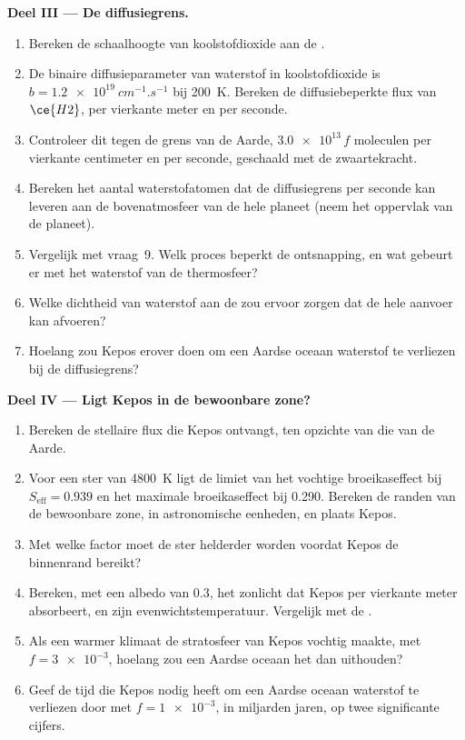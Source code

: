 \begin{problem}
\medskip\noindent\textbf{Deel III --- De diffusiegrens.}
\begin{enumerate}[resume]
\item Bereken de schaalhoogte van koolstofdioxide aan de .
\item De binaire diffusieparameter van waterstof in koolstofdioxide is
  $b = \qty{1.2e19}{cm^{-1}.s^{-1}}$ bij \qty{200}{K}. Bereken de
  diffusiebeperkte flux van $\ce{H2}$, per vierkante meter en per seconde.
\item Controleer dit tegen de grens van de Aarde, $\num{3.0e13}\,f$ moleculen per
  vierkante centimeter en per seconde, geschaald met de zwaartekracht.
\item Bereken het aantal waterstofatomen dat de diffusiegrens per seconde kan
  leveren aan de bovenatmosfeer van de hele planeet (neem het
  oppervlak van de planeet).
\item Vergelijk met vraag~9. Welk proces beperkt de ontsnapping, en wat
  gebeurt er met het waterstof van de thermosfeer?
\item Welke dichtheid van waterstof aan de  zou ervoor zorgen dat
   de hele aanvoer kan afvoeren?
\item Hoelang zou Kepos erover doen om een Aardse oceaan waterstof te verliezen
  bij de diffusiegrens?
\end{enumerate}

\medskip\noindent\textbf{Deel IV --- Ligt Kepos in de bewoonbare zone?}
\begin{enumerate}[resume]
\item Bereken de stellaire flux die Kepos ontvangt, ten opzichte van die van de Aarde.
\item Voor een ster van \qty{4800}{K} ligt de limiet van het vochtige broeikaseffect bij
  $S_\mathrm{eff} = 0.939$ en het maximale broeikaseffect bij 0.290. Bereken de
  randen van de bewoonbare zone, in astronomische eenheden, en plaats Kepos.
\item Met welke factor moet de ster helderder worden voordat Kepos de binnenrand
  bereikt?
\item Bereken, met een albedo van 0.3, het zonlicht dat Kepos per vierkante
  meter absorbeert, en zijn evenwichtstemperatuur. Vergelijk met de .
\item Als een warmer klimaat de stratosfeer van Kepos vochtig maakte, met
  $f = \num{3e-3}$, hoelang zou een Aardse oceaan het dan uithouden?
\item Geef de tijd die Kepos nodig heeft om een Aardse oceaan waterstof te verliezen door
   met $f = \num{1e-3}$, in miljarden jaren, op
  twee significante cijfers.
\end{enumerate}
\end{problem}
